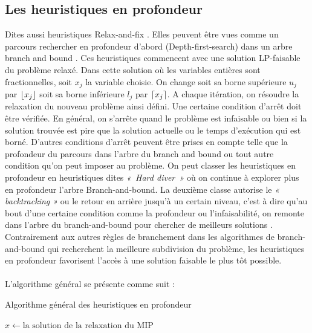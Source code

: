 \documentclass[12pt,a4paper,oneside]{book}
\theoremstyle{definition}
\DeclarePairedDelimiter\ceil{\lceil}{\rceil}
\DeclarePairedDelimiter\floor{\lfloor}{\rfloor}
\begin{document}
	\subsection{Les heuristiques en profondeur}
	Dites aussi heuristiques Relax-and-fix \cite{fischetti2010heuristics}. Elles peuvent être vues comme un parcours rechercher en profondeur d'abord (Depth-first-search) dans un arbre branch and bound \cite{Bertholda}. Ces heuristiques commencent avec une solution LP-faisable du problème relaxé. Dans cette solution où les variables entières sont fractionnelles, soit $x_j$ la variable choisie. On change soit sa borne supérieure $u_j$ par $\floor{x_j}$ soit sa borne inférieure $l_j$ par $\ceil{x_j}$. A chaque itération, on résoudre la relaxation du nouveau problème ainsi défini. Une certaine condition d’arrêt doit être vérifiée. En général, on s’arrête quand le problème est infaisable ou bien si la solution trouvée est pire que la solution actuelle ou le temps d’exécution qui est borné. D’autres conditions d’arrêt peuvent être prises en compte telle que la profondeur du parcours dans l’arbre du branch and bound ou tout autre condition qu’on peut imposer au problème.
	On peut classer les heuristiques en profondeur en heuristiques dites \textit{« Hard diver »} où on continue à explorer plus en profondeur l'arbre Branch-and-bound. La deuxième classe autorise le \textit{« backtracking »} ou le retour en arrière jusqu'à un certain niveau, c’est à dire qu’au bout d’une certaine condition comme la profondeur ou l’infaisabilité, on remonte dans l’arbre du branch-and-bound pour chercher de meilleurs solutions \cite{fischetti2010heuristics}. Contrairement aux autres règles de branchement dans les algorithmes de branch-and-bound qui recherchent la meilleure subdivision du problème, les heuristiques en profondeur favorisent l’accès à une solution faisable le plus tôt possible.
	\paragraph{}
	L’algorithme général se présente comme suit :
	
	\begin{algorithm}
		\caption{Algorithme général des heuristiques en profondeur}
		\SetAlgoLined
		\DontPrintSemicolon
		
		$\hat{x} \gets \text{la solution de la relaxation du MIP} $\;
		
	\end{algorithm}
\end{document}
